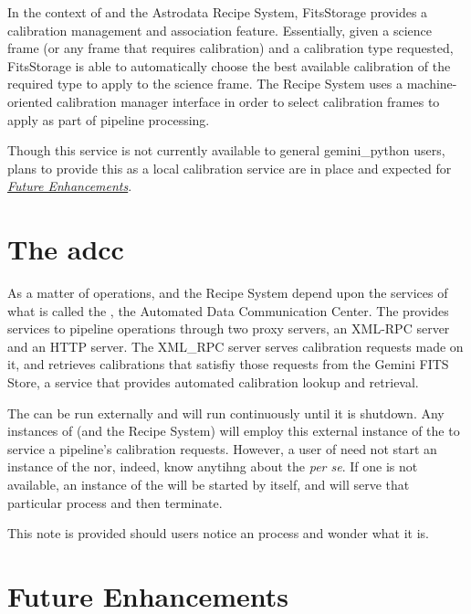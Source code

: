 \documentclass[letterpaper,10pt,english]{sphinxmanual}
\begin{document}
In the context of  and the Astrodata Recipe System, FitsStorage provides
a calibration management and association feature. Essentially, given a science
frame (or any frame that requires calibration) and a calibration
type requested, FitsStorage is able to automatically choose the best available
calibration of the required type to apply to the science frame. The Recipe System
uses a machine-oriented calibration manager interface in order to select
calibration frames to apply as part of pipeline processing.

Though this service is not currently available to general gemini\_python users,
plans to provide this as a local calibration service are in place and expected
for {\hyperref[discuss:future]{\emph{Future Enhancements}}}.


\section{The adcc}
\label{discuss:adcc}\label{discuss:the-adcc}
As a matter of operations,  and the Recipe System depend upon the
services of what is called the , the Automated Data Communication Center.
The  provides services to pipeline operations through two proxy servers,
an XML-RPC server and an HTTP server. The XML\_RPC server serves calibration
requests made on it, and retrieves calibrations that satisfiy those requests
from the Gemini FITS Store, a service that provides automated calibration
lookup and retrieval.

The  can be run externally and will run continuously until it is
shutdown. Any instances of  (and the Recipe System) will employ
this external instance of the  to service a pipeline's calibration
requests. However, a user of  need not start an instance of the
 nor, indeed, know anytihng about the  \emph{per se}. If one is not
available, an instance of the  will be started by  itself,
and will serve that particular  process and then terminate.

This note is provided should users notice an  process and wonder what
it is.


\section{Future Enhancements}
\label{discuss:future}\label{discuss:future-enhancements}
\end{document}
